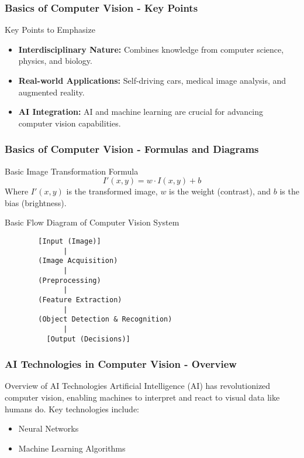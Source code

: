 \documentclass[aspectratio=169]{beamer}
\begin{document}
\begin{frame}[fragile]
    \frametitle{Basics of Computer Vision - Key Points}
    \begin{block}{Key Points to Emphasize}
        \begin{itemize}
            \item \textbf{Interdisciplinary Nature:} Combines knowledge from computer science, physics, and biology.
            \item \textbf{Real-world Applications:} Self-driving cars, medical image analysis, and augmented reality.
            \item \textbf{AI Integration:} AI and machine learning are crucial for advancing computer vision capabilities.
        \end{itemize}
    \end{block}
\end{frame}

\begin{frame}[fragile]
    \frametitle{Basics of Computer Vision - Formulas and Diagrams}
    \begin{block}{Basic Image Transformation Formula}
        \begin{equation}
            I'(x,y) = w \cdot I(x,y) + b
        \end{equation}
        Where \( I'(x,y) \) is the transformed image, \( w \) is the weight (contrast), and \( b \) is the bias (brightness).
    \end{block}
    
    \begin{block}{Basic Flow Diagram of Computer Vision System}
        \begin{verbatim}
        [Input (Image)]
              |
        (Image Acquisition)
              |
        (Preprocessing)
              |
        (Feature Extraction)
              |
        (Object Detection & Recognition)
              |
          [Output (Decisions)]
        \end{verbatim}
    \end{block}
\end{frame}

\begin{frame}[fragile]
    \frametitle{AI Technologies in Computer Vision - Overview}
    \begin{block}{Overview of AI Technologies}
        Artificial Intelligence (AI) has revolutionized computer vision, enabling machines to interpret and react to visual data like humans do. Key technologies include:
    \end{block}
    \begin{itemize}
        \item Neural Networks
        \item Machine Learning Algorithms
    \end{itemize}
\end{frame}
\end{document}
